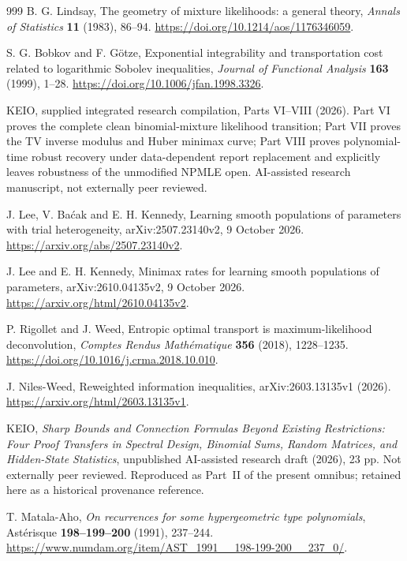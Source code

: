\documentclass[11pt,a4paper]{article}
\theoremstyle{definition}
\theoremstyle{remark}
\numberwithin{equation}{section}
\begin{document}
\begin{thebibliography}{999}
B. G. Lindsay, The geometry of mixture likelihoods: a general theory,
\emph{Annals of Statistics} \textbf{11} (1983), 86--94.
\url{https://doi.org/10.1214/aos/1176346059}.

S. G. Bobkov and F. G\"otze,
Exponential integrability and transportation cost related to logarithmic
Sobolev inequalities, \emph{Journal of Functional Analysis}
\textbf{163} (1999), 1--28.
\url{https://doi.org/10.1006/jfan.1998.3326}.

KEIO, supplied integrated research compilation, Parts VI--VIII (2026).
Part VI proves the complete clean binomial-mixture likelihood transition;
Part VII proves the TV inverse modulus and Huber minimax curve;
Part VIII proves polynomial-time robust recovery under data-dependent
report replacement and explicitly leaves robustness of the unmodified
NPMLE open.  AI-assisted research manuscript, not externally peer reviewed.

J. Lee, V. Ba\'cak and E. H. Kennedy,
Learning smooth populations of parameters with trial heterogeneity,
arXiv:2507.23140v2, 9 October 2026.
\url{https://arxiv.org/abs/2507.23140v2}.

J. Lee and E. H. Kennedy,
Minimax rates for learning smooth populations of parameters,
arXiv:2610.04135v2, 9 October 2026.
\url{https://arxiv.org/html/2610.04135v2}.

P. Rigollet and J. Weed,
Entropic optimal transport is maximum-likelihood deconvolution,
\emph{Comptes Rendus Math\'ematique} \textbf{356} (2018), 1228--1235.
\url{https://doi.org/10.1016/j.crma.2018.10.010}.

J. Niles-Weed, Reweighted information inequalities,
arXiv:2603.13135v1 (2026).
\url{https://arxiv.org/html/2603.13135v1}.

KEIO, \emph{Sharp Bounds and Connection Formulas Beyond Existing
Restrictions: Four Proof Transfers in Spectral Design, Binomial Sums,
Random Matrices, and Hidden-State Statistics}, unpublished AI-assisted
research draft (2026), 23 pp. Not externally peer reviewed.
Reproduced as Part~II of the present omnibus; retained here as a historical provenance reference.

T. Matala-Aho,
\emph{On recurrences for some hypergeometric type polynomials},
Ast\'erisque \textbf{198--199--200} (1991), 237--244.
\url{https://www.numdam.org/item/AST_1991__198-199-200__237_0/}.


\end{thebibliography}
\end{document}
